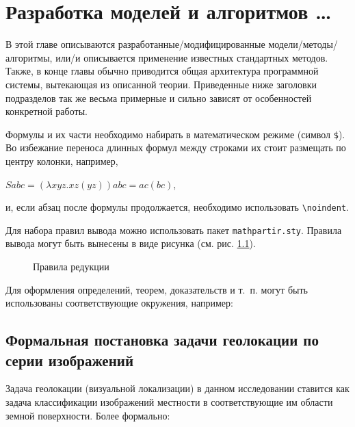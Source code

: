  \chapter{Разработка моделей и алгоритмов \dots}

В этой главе описываются разработанные/модифицированные модели/методы/
алгоритмы, или/и описывается применение известных стандартных методов. Также, 
в конце главы обычно приводится общая архитектура программной системы, 
вытекающая из описанной теории. Приведенные ниже заголовки подразделов так же 
весьма примерные и сильно зависят от особенностей конкретной работы.

Формулы и их части необходимо набирать в математическом режиме
(символ \verb|$|). Во избежание переноса длинных формул между строками их 
стоит размещать по центру колонки, например,
\begin{center}
$S a b c = (\lambda x y z. x z (y z)) a b c = a c (b c)$,
\end{center}
\noindent и, если абзац после формулы продолжается, необходимо использовать 
\verb|\noindent|.

Для набора правил вывода можно использовать пакет \texttt{mathpartir.sty}. 
Правила вывода могут быть вынесены в виде рисунка (см. рис. 
\ref{img:inferrules}).

\begin{figure}[t]
  \centering
  \caption{Правила редукции}
  \label{img:inferrules}
\end{figure}

Для оформления определений, теорем, доказательств и т.~п. могут быть 
использованы соответствующие окружения, например:



\section{Формальная постановка задачи геолокации по серии изображений}

Задача геолокации (визуальной локализации) в данном исследовании ставится как задача классификации изображений местности в соответствующие им области земной поверхности. Более формально:


